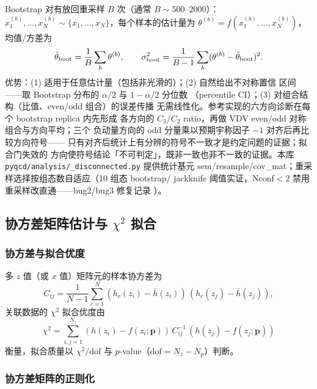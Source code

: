 \documentclass[11pt,a4paper]{ctexart}
\newcommand{\code}[1]{\texttt{#1}}
\begin{document}
Bootstrap 对有放回重采样 $B$ 次（通常 $B\sim500$--$2000$）：
$x_1^{(b)},\ldots,x_N^{(b)}\sim\{x_1,\ldots,x_N\}$，每个样本的估计量为
$\theta^{(b)}=f(x_1^{(b)},\ldots,x_N^{(b)})$，均值/方差为
\begin{equation}
\bar\theta_{\rm boot} = \frac1B\sum_b\theta^{(b)}, \qquad
\sigma^2_{\rm boot} = \frac{1}{B-1}\sum_b
(\theta^{(b)}-\bar\theta_{\rm boot})^2.
\end{equation}
优势：(1) 适用于任意估计量（包括非光滑的）；(2) 自然给出不对称置信
区间——取 Bootstrap 分布的 $\alpha/2$ 与 $1-\alpha/2$ 分位数
（percentile CI）；(3) 对组合结构（比值、even/odd 组合）的误差传播
无需线性化。参考实现的六方向诊断在每个 bootstrap replica 内先形成
各方向的 $C_3/C_2$ ratio，再做 VDV even/odd 对称组合与方向平均；三个
负动量方向的 odd 分量乘以预期宇称因子 $-1$ 对齐后再比较方向符号——
只有对齐后统计上有分辨的符号不一致才是约定问题的证据；拟合门失效的
方向使符号结论「不可判定」，既非一致也非不一致的证据。本库
\code{pyqcd/analysis/\_disconnected.py} 提供统计基元
sem/resample/cov\_mat；重采样选择按组态数自适应（10 组态 bootstrap/
jackknife 阈值实证，Nconf$<2$ 禁用重采样改直通——bug2/bug3 修复记录
）。

\subsection{协方差矩阵估计与 $\chi^2$ 拟合}

\subsubsection{协方差与拟合优度}

多 $z$ 值（或 $x$ 值）矩阵元的样本协方差为
\begin{equation}
C_{ij} = \frac{1}{N-1}\sum_{c=1}^{N}
(h_c(z_i)-\bar h(z_i))\,(h_c(z_j)-\bar h(z_j)),
\end{equation}
关联数据的 $\chi^2$ 拟合优度由
\begin{equation}
\chi^2 = \sum_{i,j=1}^{N_z}
(h(z_i)-f(z_i;\mathbf{p}))\,C^{-1}_{ij}\,
(h(z_j)-f(z_j;\mathbf{p}))
\end{equation}
衡量，拟合质量以 $\chi^2/\mathrm{dof}$ 与 $p$-value（$\mathrm{dof}
=N_z-N_p$）判断。

\subsubsection{协方差矩阵的正则化}
\end{document}

